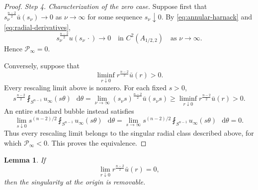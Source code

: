 \documentclass[11pt]{article}
\numberwithin{equation}{section}
\newtheorem{lemma}[theorem]{Lemma}
\theoremstyle{remark}
\newcommand{\Sph}{S}
\newcommand{\cP}{\mathcal P}
\newcommand{\dd}{\mathop{}\!\mathrm{d}}
\begin{document}
\begin{proof}
\emph{Step 4. Characterization of the zero case.}
Suppose first that
\(s_\nu^{\frac{n-2}{2}}\bar u(s_\nu)\to0\) as \(\nu\to\infty\) for some
sequence \(s_\nu\downarrow0\). By \eqref{eq:annular-harnack} and
\eqref{eq:radial-derivatives},
\[
 s_\nu^{\frac{n-2}{2}}u(s_\nu\,\cdot)\to0
 \quad\text{in }C^2(A_{1/2,2})
 \quad\text{as }\nu\to\infty.
\]
Hence \(\cP_\infty=0\).

Conversely, suppose that
\[
 \liminf_{r\downarrow0}r^{\frac{n-2}{2}}\bar u(r)>0.
\]
Every rescaling limit above is nonzero.  For each fixed \(s>0\),
\[
 s^{\frac{n-2}{2}}\fint_{\Sph^{n-1}}u_\infty(s\theta)\,\dd\theta
 =
 \lim_{\nu\to\infty}
 (s_\nu s)^{\frac{n-2}{2}}\bar u(s_\nu s)
 \ge
 \liminf_{r\downarrow0}r^{\frac{n-2}{2}}\bar u(r)>0.
\]
An entire standard bubble instead satisfies
\[
 \lim_{s\downarrow0}s^{(n-2)/2}
 \fint_{\Sph^{n-1}}u_\infty(s\theta)\,\dd\theta
 =\lim_{s\to\infty}s^{(n-2)/2}
 \fint_{\Sph^{n-1}}u_\infty(s\theta)\,\dd\theta=0.
\]
Thus every rescaling limit belongs to the singular radial class described
above, for which \(\cP_\infty<0\). This proves the equivalence.
\end{proof}

\begin{lemma}\label{lem:radial-decay-removable}
If
\[
 \lim_{r\downarrow0}r^{\frac{n-2}{2}}\bar u(r)=0,
\]
then the singularity at the origin is removable.
\end{lemma}
\end{document}
